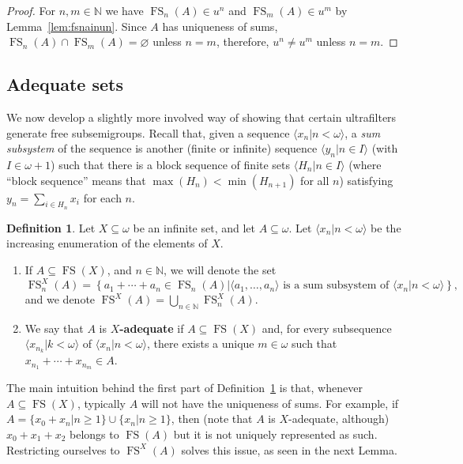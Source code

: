 \documentclass[10pt]{amsart}
\DeclareMathOperator{\fs}{FS}
\theoremstyle{definition}
\newtheorem{definition}[theorem]{Definition}
\theoremstyle{remark}
\begin{document}
\begin{proof}
    For $n,m\in\mathbb N$ we have $\fs_n(A)\in u^n$ and $\fs_m(A)\in u^m$ by Lemma~\ref{lem:fsnainun}. Since $A$ has uniqueness of sums,
    $\fs_n(A)\cap\fs_m(A)=\varnothing$ unless $n=m$, therefore, $u^n\neq u^m$ unless $n=m$.
\end{proof}

\subsection{Adequate sets}

We now develop a slightly more involved way of showing that certain ultrafilters generate free subsemigroups. Recall that, given a sequence $\langle x_n\big|n<\omega\rangle$, a {\em sum subsystem} of the sequence is another (finite or infinite) sequence $\langle y_n\big|n\in I\rangle$ (with $I\in\omega+1$) such that there is a block sequence of finite sets $\langle H_n\big|n\in I\rangle$ (where ``block sequence'' means that $\max(H_n)<\min(H_{n+1})$ for all $n$) satisfying $y_n=\sum_{i\in H_n}x_i$ for each $n$.

\begin{definition}\label{def:goodset}
     Let $X\subseteq\omega$ be an infinite set, and let $A\subseteq\omega$. Let $\langle x_n\big|n<\omega\rangle$ be the increasing enumeration of the elements of $X$.
     \begin{enumerate}
         \item If $A\subseteq\fs(X)$, and $n\in\mathbb N$, we will denote the set
         \begin{equation*}
             \fs_n^X(A)=\left\{a_1+\cdots+a_n\in\fs_n(A)\big|\langle a_1,\ldots,a_n\rangle\text{ is a sum subsystem of }\langle x_n\big|n<\omega\rangle\right\},
         \end{equation*}
        and we denote $\fs^X(A)=\bigcup_{n\in\mathbb N}\fs_n^X(A)$.
        \item We say that $A$ is {\bf $X$-adequate} if $A\subseteq\fs(X)$ and, for every subsequence $\langle x_{n_k}\big| k<\omega\rangle$ of $\langle x_n\big|n<\omega\rangle$, there exists a unique $m\in\omega$ such that $x_{n_1}+\cdots+x_{n_m}\in A$.
     \end{enumerate}
\end{definition}

The main intuition behind the first part of Definition~\ref{def:goodset} is that, whenever $A\subseteq \fs(X)$, typically $A$ will not have the uniqueness of sums. For example, if $A=\{x_0+x_n\big|n\geq 1\}\cup\{x_n\big|n\geq 1\}$, then (note that $A$ is $X$-adequate, although) $x_0+x_1+x_2$ belongs to $\fs(A)$ but it is not uniquely represented as such. Restricting ourselves to $\fs^X(A)$ solves this issue, as seen in the next Lemma.
\end{document}
